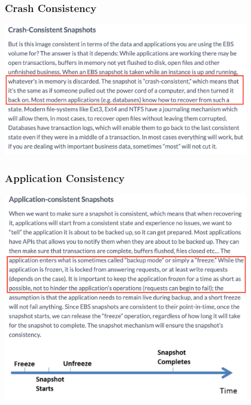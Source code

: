 \documentclass[UTF8,8pt,xcolor=dvipsnames]{beamer}
\begin{document}
\begin{frame}[fragile]
    \frametitle{Crash Consistency}
    \begin{center}
        \includegraphics[width=0.8\textwidth]{../imgs/crash-consistency.png}
    \end{center}
\end{frame}

\begin{frame}[fragile]
    \frametitle{Application Consistency}
    \begin{center}
        \includegraphics[width=0.8\textwidth]{../imgs/application-consistency.png}
    \end{center}
\end{frame}
\end{document}

